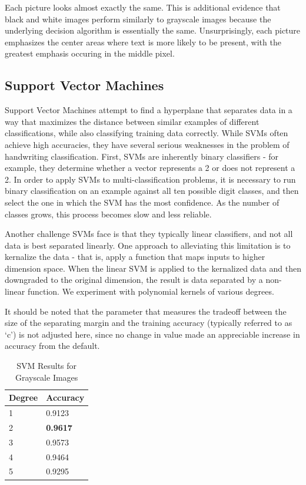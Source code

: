 \documentclass[12pt]{article}
\begin{document}
Each picture looks almost exactly the same. This is additional evidence that black and white images perform similarly to grayscale images because the underlying decision algorithm is essentially the same. Unsurprisingly, each picture emphasizes the center areas where text is more likely to be present, with the greatest emphasis occuring in the middle pixel. 

\subsection*{Support Vector Machines}
Support Vector Machines attempt to find a hyperplane that separates data in a way that maximizes the distance between similar examples of different classifications, while also classifying training data correctly. While SVMs often achieve high accuracies, they have several serious weaknesses in the problem of handwriting classification. First, SVMs are inherently binary classifiers - for example, they determine whether a vector represents a 2 or does not represent a 2. In order to apply SVMs to multi-classification problems, it is necessary to run binary classification on an example against all ten possible digit classes, and then select the one in which the SVM has the most confidence. As the number of classes grows, this process becomes slow and less reliable. 

Another challenge SVMs face is that they typically linear classifiers, and not all data is best separated linearly. One approach to alleviating this limitation is to kernalize the data - that is, apply a function that maps inputs to higher dimension space. When the linear SVM is applied to the kernalized data and then downgraded to the original dimension, the result is data separated by a non-linear function. We experiment with polynomial kernels of various degrees. 

It should be noted that the parameter that measures the tradeoff between the size of the separating margin and the training accuracy (typically referred to as ‘c’) is not adjusted here, since no change in value made an appreciable increase in accuracy from the default.

\begin{table}[ht!]
\centering
\caption{SVM Results for Grayscale Images}
    \begin{tabular}{|l|l|}
    \hline
    Degree & Accuracy \\ \hline
    1      & 0.9123   \\ \hline
    2      & \textbf{0.9617}   \\ \hline
    3      & 0.9573   \\ \hline
    4      & 0.9464   \\ \hline
    5      & 0.9295   \\ \hline
    \end{tabular}
\end{table}
\end{document}
